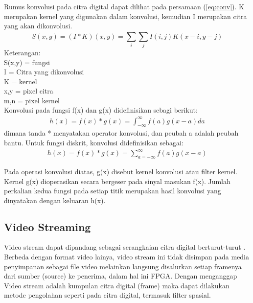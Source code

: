 Rumus konvolusi pada citra digital dapat dilihat pada persamaan (\ref{eq:conv}). K merupakan kernel yang digunakan dalam konvolusi, kemudian I merupakan citra yang akan dikonvolusi. 
\begin{equation}
    \label{eq:conv}
    S(x,y) = (I * K)(x,y) = \sum_{i}^{} \sum_{j}^{} I(i,j)K(x-i, y-j)
\end{equation}
Keterangan: \\
    \hspace{1cm} S(x,y) = fungsi \\
    \hspace{1cm}  I = Citra yang dikonvolusi \\
    \hspace{1cm} K = kernel \\
    \hspace{1cm} x,y = pixel citra \\
    \hspace{1cm} m,n = pixel kernel \\


Konvolusi pada fungsi f(x) dan g(x) didefinisikan sebagi berikut:
\begin{equation}
    \label{eq:conv1}
    \begin{split}
        h(x) = f(x) * g(x) = \int_{-\infty}^{\infty} f(a)g(x-a) da
    \end{split}
\end{equation}
dimana tanda * menyatakan operator konvolusi, dan peubah a adalah peubah bantu. Untuk fungsi diskrit, konvolusi didefinisikan sebagai:
\begin{equation}
    \label{eq:conv2}
    \begin{split}
         h(x) = f(x) * g(x) = \sum_{a=-\infty}^{\infty} f(a)g(x-a)
    \end{split}
\end{equation}

Pada operasi konvolusi diatas, g(x) disebut kernel konvolusi atau filter kernel. Kernel g(x) dioperasikan secara bergeser pada sinyal masukan f(x). Jumlah perkalian kedua fungsi pada setiap titik merupakan hasil konvolusi yang dinyatakan dengan keluaran h(x).


\subsection{Video Streaming}
Video stream dapat dipandang sebagai serangkaian citra digital berturut-turut . Berbeda dengan format video lainya, video stream ini tidak disimpan pada media penyimpanan sebagai file video melainkan langsung disalurkan setiap framenya dari sumber (source) ke penerima, dalam hal ini FPGA.  Dengan menganggap Video stream adalah kumpulan citra digital (frame) maka dapat dilakukan metode pengolahan seperti pada citra digital, termasuk filter spasial. 


